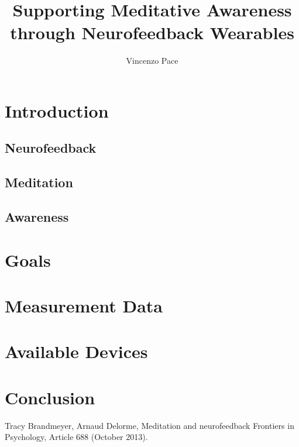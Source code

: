 \documentclass{llncs} %
\begin{document}
\title{Supporting Meditative Awareness through Neurofeedback Wearables}
\author{Vincenzo Pace}
\maketitle
\newpage
\section{Introduction}
\subsection{Neurofeedback}
\subsection{Meditation}
\subsection{Awareness}
\section{Goals}
\section{Measurement Data}
\section{Available Devices}
\section{Conclusion}


\begin{thebibliography}{[MT1]}
    Tracy Brandmeyer, Arnaud Delorme,
    Meditation and neurofeedback
    Frontiers in Psychology, Article 688 (October 2013).
    \end{thebibliography}
\end{document}
